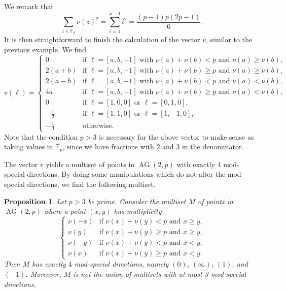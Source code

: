 \documentclass[12pt, a4paper]{article}
\newtheorem{prop}[thm]{Proposition}
\theoremstyle{definition}
\newcommand{\FF}{\mathbb F}
\newcommand{\zs}[1]{\textcolor{teal}{#1}}
\DeclareMathOperator{\AG}{AG}
\newcommand{\ag}{\AG}
\begin{document}
We remark that
\[
 \sum_{z \in \FF_p} \nu(z)^2 = \sum_{i=1}^{p-1} i^2 = \frac{(p-1)p(2p-1)}{6}.
\]
It is then straightforward to finish the calculation of the vector $v$, similar to the previous example.
We find
\[
 v(\ell) = \begin{cases}
  0 & \text{if $\ell = [a,b,-1]$ with $\nu(a) + \nu(b) < p$ and $\nu(a) \geq \nu(b)$}, \\
  2(a+b) & \text{if $\ell = [a,b,-1]$ with $\nu(a) + \nu(b) \geq p$ and $\nu(a) \geq \nu(b)$}, \\
  2(a-b) & \text{if $\ell = [a,b,-1]$ with $\nu(a) + \nu(b) < p$ and $\nu(a) < \nu(b)$}, \\
  4a & \text{if $\ell = [a,b,-1]$ with $\nu(a) + \nu(b) \geq p$ and $\nu(a) < \nu(b)$}, \\
  0 & \text{if } \ell = [1,0,0] \text{ or } \ell = [0,1,0], \\
  - \frac 12 & \text{if } \ell = [1,1,0] \text{ or } \ell = [1,-1,0], \\
  - \frac 13 & \text{otherwise}.
 \end{cases}
\]
Note that the condition $p > 3$ is necessary for the above vector to make sense as taking values in $\FF_p$, since we have fractions with $2$ and $3$ in the denominator.

The vector $v$ yields a multiset of points in $\ag(2,p)$ with exactly 4 mod-special directions.
By doing some manipulations which do not alter the mod-special directions, we find the following multiset.

\begin{prop}
 Let $p > 3$ be prime.
 Consider the multiset $M$ of points in $\ag(2,p)$ where a point $(x,y)$ has multiplicity
 \[
  \begin{cases}
  \nu(-x) & \text{if $\nu(x) + \nu(y) < p$ and $x \geq y$,} \\
  \nu(y) & \text{if $\nu(x) + \nu(y) \geq p$ and $x \geq y$,} \\
  \nu(-y) & \text{if $\nu(x) + \nu(y) < p$ and $x < y$,} \\
  \nu(x) & \text{if $\nu(x) + \nu(y) \geq p$ and $x < y$.}
  \end{cases}
 \]
 Then $M$ has exactly $4$ mod-special directions, namely $(0)$, $(\infty)$, $(1)$, and $(-1)$.
 Moreover, $M$ is not the union of multisets with at most 3 mod-special directions.
\end{prop}
\end{document}

